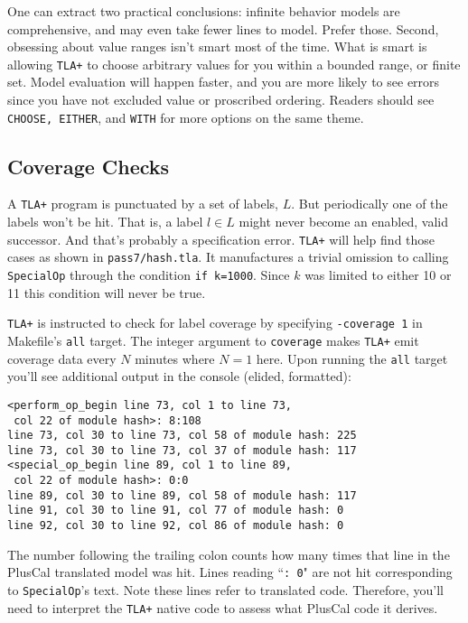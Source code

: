 \documentclass[twocolumn]{article}
\begin{document}
One can extract two practical conclusions: infinite behavior models are comprehensive, and may even take fewer lines to model. Prefer those. Second, obsessing about value ranges isn't smart most of the time. What is smart is allowing \texttt{TLA+} to choose arbitrary values for you within a bounded range, or finite set. Model evaluation will happen faster, and you are more likely to see errors since you have not excluded value or proscribed ordering. Readers should see \texttt{CHOOSE, EITHER}, and \texttt{WITH} for more options on the same theme.

\subsection{Coverage Checks}
A \texttt{TLA+} program is punctuated by a set of labels, $L$. But periodically one of the labels won't be hit. That is, a label $l \in L$ might never become an enabled, valid successor. And that's probably a specification error. \texttt{TLA+} will help find those cases as shown in \texttt{pass7/hash.tla}. It manufactures a trivial omission to calling \texttt{SpecialOp} through the condition \texttt{if k=1000}. Since $k$ was limited to either 10 or 11 this condition will never be true. 

\texttt{TLA+} is instructed to check for label coverage by specifying \texttt{-coverage 1} in Makefile's \texttt{all} target. The integer argument to \texttt{coverage} makes \texttt{TLA+} emit coverage data every $N$ minutes where $N=1$ here. Upon running the \texttt{all} target you'll see additional output in the console (elided, formatted):

\begin{verbatim}
<perform_op_begin line 73, col 1 to line 73, 
 col 22 of module hash>: 8:108
line 73, col 30 to line 73, col 58 of module hash: 225
line 73, col 30 to line 73, col 37 of module hash: 117
<special_op_begin line 89, col 1 to line 89,
 col 22 of module hash>: 0:0
line 89, col 30 to line 89, col 58 of module hash: 117
line 91, col 30 to line 91, col 77 of module hash: 0
line 92, col 30 to line 92, col 86 of module hash: 0
\end{verbatim}

The number following the trailing colon counts how many times that line in the PlusCal translated model was hit. Lines reading ``\texttt{: 0}" are not hit corresponding to \texttt{SpecialOp}'s text. Note these lines refer to translated code. Therefore, you'll need to interpret the \texttt{TLA+} native code to assess what PlusCal code it derives. 
\end{document}
